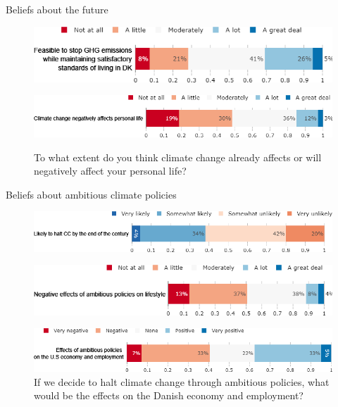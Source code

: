 \documentclass[aspectratio=169,9pt,dvipsnames]{beamer}
\begin{document}
\begin{frame}{Beliefs about the future}%
\begin{figure}[h!]
\caption{To what extent do you think that it is technically feasible to stop greenhouse gas emissions while maintaining satisfactory standards of living in Denmark?}
\includegraphics[width=.6\textwidth]{../figures/DK/net_zero_feasible_DK.png} \\
\caption{To what extent do you think climate change already affects or will negatively affect your personal life?}
\includegraphics[width=.7\textwidth]{../figures/DK/CC_affects_self_DK.png} \\
\end{figure}
\end{frame}

\begin{frame}{Beliefs about ambitious climate policies}%
\begin{figure}[h!]
\centering
\caption{How likely is it that human kind halt climate change by the end of the century?}
\includegraphics[width=.7\textwidth]{../figures/DK/CC_will_end_DK.png}\\
\caption{If we decide to halt climate change through ambitious policies, to what extent do you think it would negatively affect your lifestyle?}
\includegraphics[width=.7\textwidth]{../figures/DK/effect_halt_CC_lifestyle_DK.png} \\
\caption{If we decide to halt climate change through ambitious policies, what would be the effects on the Danish economy and employment?}
\includegraphics[width=.7\textwidth]{../figures/DK/effect_halt_CC_economy_DK.png}
\end{figure}
\end{frame}
\end{document}
